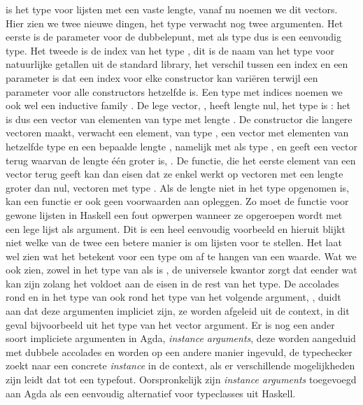  is het type voor lijsten met een vaste lengte, vanaf nu noemen we
dit vectors. Hier zien we twee nieuwe dingen, het type  verwacht nog
twee argumenten. Het eerste is de parameter voor de dubbelepunt,  met
als type  dus  is een eenvoudig type. Het tweede is de
index van het type , dit is de naam van het type voor natuurlijke
getallen uit de standard library, het verschil tussen een index en een
parameter is dat een index voor elke constructor kan variëren terwijl een
parameter voor alle constructors hetzelfde is. Een type met indices noemen we
ook wel een inductive family \cite{indfam}. De lege vector, \iagda{[]}, heeft
lengte nul, het type is : het is dus een vector van elementen
van type  met lengte . De constructor die langere vectoren
maakt, verwacht een element,  van type , een vector met
elementen van hetzelfde type  en een bepaalde lengte ,
namelijk  met als type , en geeft een vector terug
waarvan de lengte één groter is, . De 
functie, die het eerste element van een vector terug geeft kan dan eisen dat ze
enkel werkt op vectoren met een lengte groter dan nul, vectoren met type
. Als de lengte niet in het type opgenomen is, kan een
functie er ook geen voorwaarden aan opleggen. Zo moet de  functie
voor gewone lijsten in Haskell een fout opwerpen wanneer ze opgeroepen wordt
met een lege lijst als argument.  Dit is een heel eenvoudig voorbeeld en
hieruit blijkt niet welke van de twee een betere manier is om lijsten voor te
stellen.  Het laat wel zien wat het betekent voor een type om af te hangen van
een waarde. Wat we ook zien, zowel in het type van  als 
is , de universele kwantor zorgt dat  eender wat kan zijn
zolang het voldoet aan de eisen in de rest van het type. De accolades rond
 en in het type van  ook rond het type van het volgende
argument, , duidt aan dat deze argumenten impliciet zijn, ze
worden afgeleid uit de context, in dit geval bijvoorbeeld uit het type van het
vector argument. Er is nog een ander soort impliciete argumenten in Agda,
\emph{instance arguments}, deze worden aangeduid met dubbele accolades en
worden op een andere manier ingevuld, de typechecker zoekt naar een concrete
\emph{instance} in de context, als er verschillende mogelijkheden zijn leidt
dat tot een typefout. Oorspronkelijk zijn \emph{instance arguments} toegevoegd
aan Agda als een eenvoudig alternatief voor typeclasses uit Haskell.

